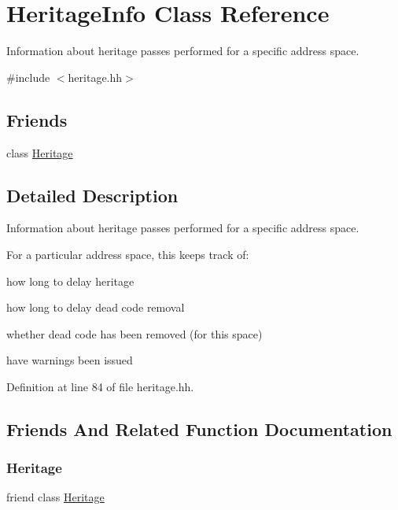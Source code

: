 \hypertarget{class_heritage_info}{}\section{Heritage\+Info Class Reference}
\label{class_heritage_info}


Information about heritage passes performed for a specific address space.  




{\ttfamily \#include $<$heritage.\+hh$>$}

\subsection*{Friends}
\begin{DoxyCompactItemize}
\item 
class \mbox{\hyperlink{class_heritage_info_a856a6ac40847cd2931af8dbd470881cb}{Heritage}}
\end{DoxyCompactItemize}


\subsection{Detailed Description}
Information about heritage passes performed for a specific address space. 

For a particular address space, this keeps track of\+:
\begin{DoxyItemize}
\item how long to delay heritage
\item how long to delay dead code removal
\item whether dead code has been removed (for this space)
\item have warnings been issued 
\end{DoxyItemize}

Definition at line 84 of file heritage.\+hh.



\subsection{Friends And Related Function Documentation}
\mbox{\label{class_heritage_info_a856a6ac40847cd2931af8dbd470881cb}} 
\subsubsection{\texorpdfstring{Heritage}{Heritage}}
{\footnotesize\ttfamily friend class \mbox{\hyperlink{class_heritage}{Heritage}}\hspace{0.3cm}{\ttfamily [friend]}}



